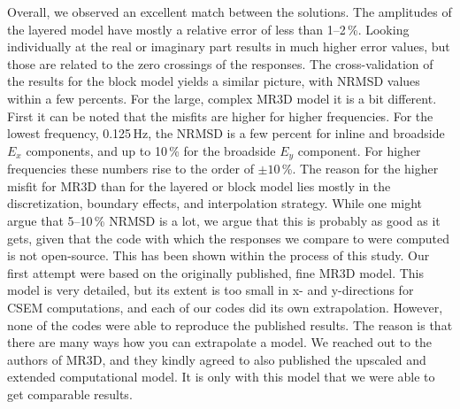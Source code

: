 \documentclass[onecolumn,extra,camera]{gji}
\begin{document}
Overall, we observed an excellent match between the solutions. The amplitudes of the layered model have mostly a relative error of less than 1--2\,\%. Looking individually at the real or imaginary part results in much higher error values, but those are related to the zero crossings of the responses. The cross-validation of the results for the block model yields a similar picture, with NRMSD values within a few percents. For the large, complex MR3D model it is a bit different. First it can be noted that the misfits are higher for higher frequencies. For the lowest frequency, 0.125\,Hz, the NRMSD is a few percent for inline and broadside $E_x$ components, and up to 10\,\% for the broadside $E_y$ component. For higher frequencies these numbers rise to the order of $\pm10\,$\%. The reason for the higher misfit for MR3D than for the layered or block model lies mostly in the discretization, boundary effects, and interpolation strategy. While one might argue that 5--10\,\% NRMSD is a lot, we argue that this is probably as good as it gets, given that the code with which the responses we compare to were computed is not open-source. This has been shown within the process of this study. Our first attempt were based on the originally published, fine MR3D model. This model is very detailed, but its extent is too small in x- and y-directions for CSEM computations, and each of our codes did its own extrapolation. However, none of the codes were able to reproduce the published results. The reason is that there are many ways how you can extrapolate a model. We reached out to the authors of MR3D, and they kindly agreed to also published the upscaled and extended computational model. It is only with this model that we were able to get comparable results.
\end{document}
